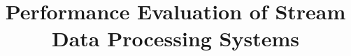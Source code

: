 \documentclass{vldb}
\begin{document}

\title{ Performance Evaluation of Stream Data Processing Systems}



%
%
%
%

\end{document}
